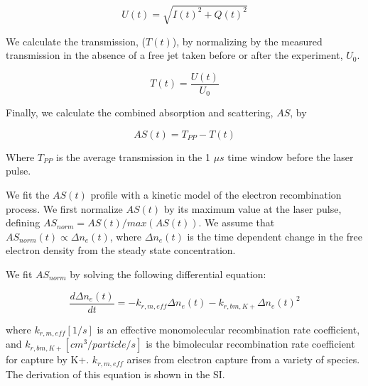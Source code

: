 \begin{equation}
    U(t) = \sqrt{I(t)^2 + Q(t)^2}
\end{equation}

We calculate the transmission, ($T(t)$), by normalizing by the measured transmission in the absence of a free jet taken before or after the experiment, $U_0$. 

\begin{equation}
    T(t) = \frac{U(t)}{U_{0}}
\end{equation}

Finally, we calculate the combined absorption and scattering, $AS$, by

\begin{equation}
    AS(t) = T_{PP} - T(t)
\end{equation}

Where $T_{PP}$ is the average transmission in the 1 $\mu s$ time window before the laser pulse.


We fit the $AS (t)$ profile with a kinetic model of the electron recombination process. We first normalize $AS (t)$ by its maximum value at the laser pulse, defining $AS_{norm} = AS(t)/max(AS(t))$. We assume that $AS_{norm}(t) \propto \Delta n_e (t)$, where $\Delta n_e (t)$ is the time dependent change in the free electron density from the steady state concentration. 

We fit $AS_{norm}$ by solving the following differential equation: 

\begin{equation}
    \label{eq:fit_eq}
    \frac{d\Delta n_e (t)}{dt} = - k_{r, m, eff} \Delta n_e (t) - k_{r, bm, K+}\Delta{n_e (t)}^2
\end{equation}

where $k_{r, m, eff} [1/s]$ is an effective monomolecular recombination rate coefficient, and $k_{r, bm, K+} [cm^3/particle/s]$ is the bimolecular recombination rate coefficient for capture by K+. $k_{r, m, eff}$ arises from electron capture from a variety of species. The derivation of this equation is shown in the SI.

